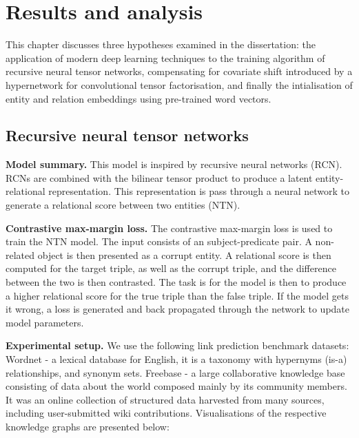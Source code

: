 

\chapter{Results and analysis}  %

\ifpdf
     \graphicspath{{Figs/Chapter4/}}
\else
    \graphicspath{{Chapter4/Figs/Vector/}{Chapter4/Figs/}}
\fi

This chapter discusses three hypotheses examined in the dissertation: the application of modern deep learning techniques to the training algorithm of recursive neural tensor networks, compensating for covariate shift introduced by a hypernetwork for convolutional tensor factorisation, and finally the intialisation of entity and relation embeddings using pre-trained word vectors. 



\section{Recursive neural tensor networks}

\noindent \textbf{Model summary.} This model is inspired by recursive neural networks (RCN). RCNs are combined with the bilinear tensor product to produce a latent entity-relational representation. This representation is pass through a neural network to generate a relational score between two entities (NTN). 

\noindent \textbf{Contrastive max-margin loss.} The contrastive max-margin loss is used to train the NTN model. The input consists of an subject-predicate pair. A non-related object is then presented as a corrupt entity. A relational score is then computed for the target triple, as well as the corrupt triple, and the difference between the two is then contrasted. The task is for the model is then to produce a higher relational score for the true triple than the false triple. If the model gets it wrong, a loss is generated and back propagated through the network to update model parameters. \par

\noindent \textbf{Experimental setup.} We use the following link prediction benchmark datasets: Wordnet - a lexical database for English, it is a taxonomy with hypernyms (is-a) relationships, and synonym sets. Freebase - a large collaborative knowledge base consisting of data about the world composed mainly by its community members. It was an online collection of structured data harvested from many sources, including user-submitted wiki contributions. \newline
Visualisations of the respective knowledge graphs are presented below:

